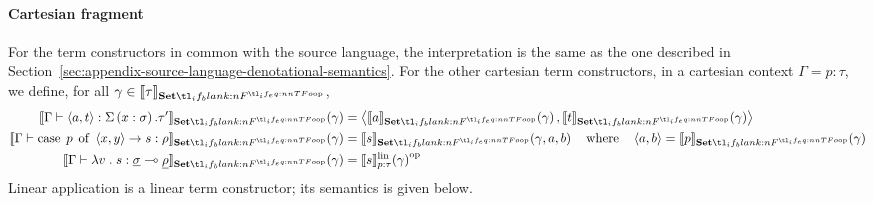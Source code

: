 \documentclass[11pt,a4paper]{article}
\theoremstyle{definition}
\theoremstyle{remark}
\providecommand{\lintype}[1]{\underline{#1}}
\providecommand{\setint}[1]{\llbracket #1\rrbracket_{\Set}}
\providecommand{\linint}[2]{\llbracket #1\rrbracket_{#2}^{\mathrm{lin}}}
\providecommand{\linto}{\multimap}
\begin{document}
\paragraph{Cartesian fragment}
For the term constructors in common with the source language, the interpretation is the same as the one described in Section~\ref{sec:appendix-source-language-denotational-semantics}. For the other cartesian term constructors, in a cartesian context \(\Gamma=p:\tau\), we define, for all \( \gamma \in \setint{\tau} \),
\begin{equation}
  \label{eq:appendix-target-language-new-cartesian-term-constructors-semantics}
  \begin{aligned}
    \fn[n]{
    \setint{
    \Gamma \vdash
    \tuple{ a, t }: \Sigma \left( x : \sigma \right) . \tau'
    }
    }{ \gamma }
    &=
      \tuple{
      \fn[n]{ \setint{a} }{ \gamma },
      \fn[n]{ \setint{t} }{ \gamma }
      }
    \\
    \fn[n]{
    \setint{
    \Gamma \vdash
    \opn[b]{case} \; p \; \opn[b]{of} \; \tuple{x,y} \to s : \rho
    }
    }{ \gamma }
    &=
      \fn[n]{ \setint{s} }{ \gamma, a, b }
      \qq{where}
      \tuple{ a, b } = \fn[n]{ \setint{p} }{ \gamma }
    \\
    \fn[n]{
    \setint{
    \Gamma \vdash
    \lambda v \; . \; s:
    \lintype{\sigma} \linto \lintype{\rho}
    }
    }{ \gamma }
    &=
      \opmor[p]{ \fn[n]{ \linint{s}{p : \tau} }{ \gamma } }
  \end{aligned}
\end{equation}
Linear application is a linear term constructor; its semantics is given below.
\end{document}
